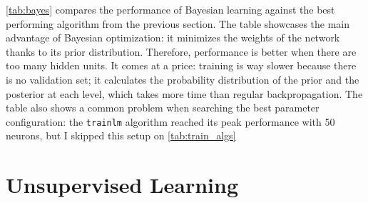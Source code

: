 \documentclass[a4paper, 10pt]{article}
\begin{document}
    \autoref{tab:bayes} compares the performance of Bayesian learning against the 
    best performing algorithm from the previous section. The table showcases the
    main advantage of Bayesian optimization: it minimizes the weights of the
    network thanks to its prior distribution. Therefore, performance is better
    when there are too many hidden units. It comes at a price: training is way slower
    because there is no validation set; it calculates the probability distribution
    of the prior and the posterior at each level, which takes more time than regular
    backpropagation. The table also shows a common problem when searching the best
    parameter configuration: the \texttt{trainlm} algorithm reached its peak 
    performance with 50 neurons, but I skipped this setup on \autoref{tab:train_algs}




  





\newpage
\section{Unsupervised Learning}
\end{document}
